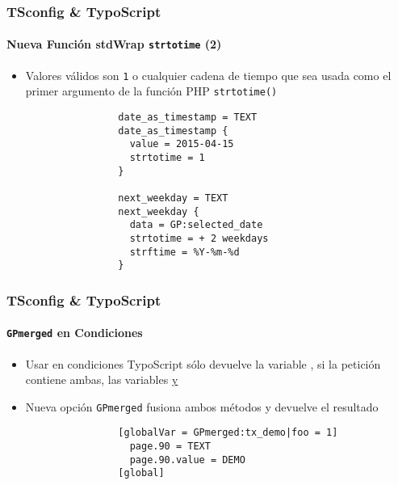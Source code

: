 \begin{frame}[fragile]
	\frametitle{TSconfig \& TypoScript}
	\framesubtitle{Nueva Función stdWrap \texttt{strtotime} (2)}

	\begin{itemize}

		\item Valores válidos son \texttt{1} o cualquier cadena de tiempo que sea usada como el primer
			argumento de la función PHP \texttt{strtotime()}

			\begin{lstlisting}
				date_as_timestamp = TEXT
				date_as_timestamp {
				  value = 2015-04-15
				  strtotime = 1
				}

				next_weekday = TEXT
				next_weekday {
				  data = GP:selected_date
				  strtotime = + 2 weekdays
				  strftime = %Y-%m-%d
				}
			\end{lstlisting}

	\end{itemize}

\end{frame}


\begin{frame}[fragile]
	\frametitle{TSconfig \& TypoScript}
	\framesubtitle{\texttt{GPmerged} en Condiciones}

	\begin{itemize}

		\item Usar  en condiciones TypoScript sólo devuelve la variable
			, si la petición contiene ambas, las variables  \underline{y}

		\item Nueva opción \texttt{GPmerged} fusiona ambos métodos y devuelve el resultado

			\begin{lstlisting}
				[globalVar = GPmerged:tx_demo|foo = 1]
				  page.90 = TEXT
				  page.90.value = DEMO
				[global]
			\end{lstlisting}

	\end{itemize}

\end{frame}

